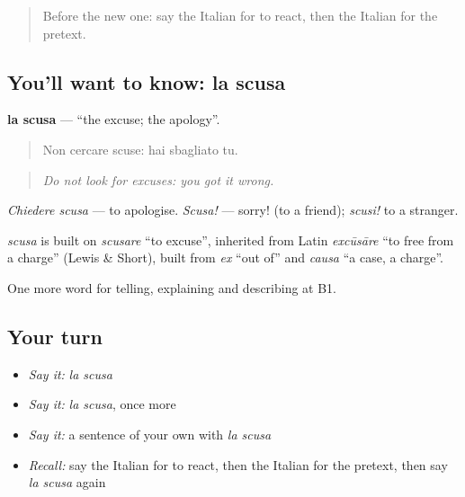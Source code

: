 \begin{quote}
Before the new one: say the Italian for to react, then the Italian for the pretext.
\end{quote}

\subsection*{You'll want to know: la scusa}
\textbf{la scusa} — \textquotedblleft{}the excuse; the apology\textquotedblright{}.

\begin{quote}
Non cercare scuse: hai sbagliato tu.
\end{quote}

\begin{quote}
\emph{Do not look for excuses: you got it wrong.}
\end{quote}

\emph{Chiedere scusa} — to apologise. \emph{Scusa!} — sorry! (to a friend); \emph{scusi!} to a stranger.

\begin{cousinweb}
\emph{scusa} is built on \emph{scusare} \textquotedblleft{}to excuse\textquotedblright{}, inherited from Latin \emph{excūsāre} \textquotedblleft{}to free from a charge\textquotedblright{} (Lewis \& Short), built from \emph{ex} \textquotedblleft{}out of\textquotedblright{} and \emph{causa} \textquotedblleft{}a case, a charge\textquotedblright{}.
\end{cousinweb}

\begin{grammarlens}[title={What you've built}]
One more word for telling, explaining and describing at B1.
\end{grammarlens}

\subsection*{Your turn}
\begin{itemize}
\raggedright
  \item \emph{Say it:} \emph{la scusa}
  \item \emph{Say it:} \emph{la scusa}, once more
  \item \emph{Say it:} a sentence of your own with \emph{la scusa}
  \item \emph{Recall:} say the Italian for to react, then the Italian for the pretext, then say \emph{la scusa} again
\end{itemize}

